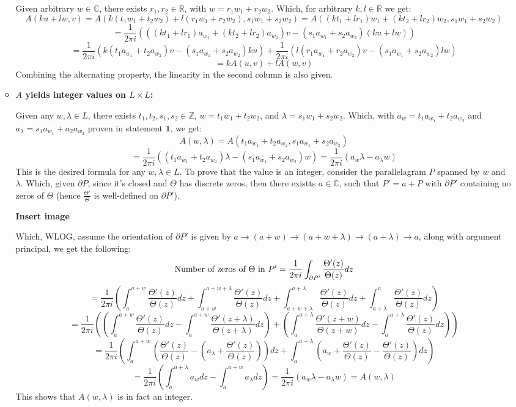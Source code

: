 \documentclass{article}
\begin{document}
\begin{itemize}
\begin{itemize}
        Given arbitrary $w \in\mathbb{C}$, there exists $r_1,r_2\in\mathbb{R}$, with $w=r_1w_1+r_2w_2$. Which, for arbitrary $k,l\in\mathbb{R}$ we get:
        $$A(ku+lw,v)=A(k(t_1w_1+t_2w_2)+l(r_1w_1+r_2w_2),s_1w_1+s_2w_2) = A((kt_1+lr_1)w_1+(kt_2+lr_2)w_2,s_1w_1+s_2w_2)$$
        $$ = \frac{1}{2\pi i}(((kt_1+lr_1)a_{w_1}+(kt_2+lr_2)a_{w_2})v-(s_1a_{w_1}+s_2a_{w_2})(ku+lw))$$
        $$ = \frac{1}{2\pi i}\left(k(t_1a_{w_1}+t_2a_{w_2})v - (s_1a_{w_1}+s_2a_{w_2})ku\right)+\frac{1}{2\pi i}\left(l(r_1a_{w_1}+r_2a_{w_2})v - (s_1a_{w_1}+s_2a_{w_2})lw\right)$$
        $$ = kA(u,v)+lA(w,v)$$
        Combining the alternating property, the linearity in the second column is also given.

        \item \textbf{$A$ yields integer values on $L\times L$:}
        
        Given any $w,\lambda\in L$, there exists $t_1,t_2,s_1,s_2\in \mathbb{Z}$, $w=t_1w_1+t_2w_2$, and $\lambda = s_1w_1+s_2w_2$. Which, with $a_w=t_1a_{w_1}+t_2a_{w_2}$ and $a_{\lambda}=s_1a_{w_1}+a_2a_{w_2}$ proven in statement $\textbf{1}$, we get:
        $$A(w,\lambda) = A(t_1a_{w_1}+t_2a_{w_2},s_1a_{w_1}+s_2a_{w_2})$$
        $$=\frac{1}{2\pi i}((t_1a_{w_1}+t_2a_{w_2})\lambda - (s_1a_{w_1}+s_2a_{w_2})w) = \frac{1}{2\pi i}(a_w\lambda -a_\lambda w)$$
        This is the desired formula for any $w,\lambda\in L$. To prove that the value is an integer, consider the parallelagram $P$ spanned by $w$ and $\lambda$. Which, given $\partial P$, since it's closed and $\Theta$ has discrete zeros, then there existts $a\in\mathbb{C}$, such that $P'=a+P$ with $\partial P'$ containing no zeros of $\Theta$ (hence $\frac{\Theta'}{\Theta}$ is well-defined on $\partial P'$). 
        
        \textbf{Insert image}
        
        Which, WLOG, assume the orientation of $\partial P'$ is given by $a\rightarrow (a+w)\rightarrow (a+w+\lambda)\rightarrow (a+\lambda)\rightarrow a$, along with argument principal, we get the following:
        $$\textmd{Number of zeros of } \Theta \textmd{ in } P' = \frac{1}{2\pi i}\int_{\partial P'}\frac{\Theta'(z)}{\Theta(z)}dz$$
        $$ = \frac{1}{2\pi i}\left(\int_{a}^{a+w}\frac{\Theta'(z)}{\Theta(z)}dz+\int_{a+w}^{a+w+\lambda}\frac{\Theta'(z)}{\Theta(z)}dz+\int_{a+w+\lambda}^{a+\lambda}\frac{\Theta'(z)}{\Theta(z)}dz+\int_{a+\lambda}^{a}\frac{\Theta'(z)}{\Theta(z)}dz\right)$$
        $$=\frac{1}{2\pi i}\left(\left(\int_{a}^{a+w}\frac{\Theta'(z)}{\Theta(z)}dz - \int_{a}^{a+w}\frac{\Theta'(z+\lambda)}{\Theta(z+\lambda)}dz\right)+\left(\int_{a}^{a+\lambda}\frac{\Theta'(z+w)}{\Theta(z+w)}dz - \int_{a}^{a+\lambda}\frac{\Theta'(z)}{\Theta(z)}dz\right)\right)$$
        $$=\frac{1}{2\pi i}\left(\int_{a}^{a+w}\left(\frac{\Theta'(z)}{\Theta(z)}-\left(a_\lambda+\frac{\Theta'(z)}{\Theta(z)}\right)\right)dz + \int_{a}^{a+\lambda}\left(a_w+\frac{\Theta'(z)}{\Theta(z)}-\frac{\Theta'(z)}{\Theta(z)}\right)dz\right)$$
        $$ = \frac{1}{2\pi i}\left(\int_{a}^{a+\lambda}a_wdz - \int_{a}^{a+w}a_\lambda dz\right) = \frac{1}{2\pi i}(a_w\lambda - a_\lambda w) = A(w,\lambda)$$
        This shows that $A(w,\lambda)$ is in fact an integer.
    \end{itemize}


\end{itemize}
\end{document}
